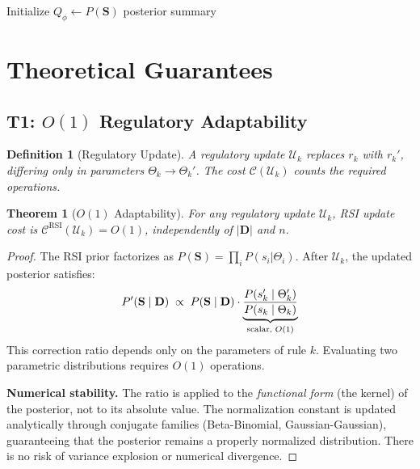 \documentclass[letterpaper]{article}
\newtheorem{theorem}{Theorem}
\newtheorem{definition}{Definition}
\begin{document}
\begin{algorithm}[H]
\SetAlgoLined
{}
Initialize $Q_\phi \leftarrow P(\mathbf{S})$\;
\Return posterior summary
\caption{RSI: Rule-State Inference (Mean-Field VI)}
\label{alg:rsi}
\end{algorithm}

\section{Theoretical Guarantees}
\label{sec:theory}

\subsection{T1: $O(1)$ Regulatory Adaptability}

\begin{definition}[Regulatory Update]
A regulatory update $\mathcal{U}_k$ replaces $r_k$ with $r_k'$,
differing only in parameters $\Theta_k \to \Theta_k'$.
The cost $\mathcal{C}(\mathcal{U}_k)$ counts the required operations.
\end{definition}

\begin{theorem}[$O(1)$ Adaptability]
\label{thm:o1}
For any regulatory update $\mathcal{U}_k$, RSI update cost is
$\mathcal{C}^{\mathrm{RSI}}(\mathcal{U}_k) = O(1)$, independently
of $|\mathbf{D}|$ and $n$.
\end{theorem}

\begin{proof}
The RSI prior factorizes as $P(\mathbf{S}) = \prod_i P(s_i | \Theta_i)$.
After $\mathcal{U}_k$, the updated posterior satisfies:
\[
  P'(\mathbf{S} \mid \mathbf{D}) \;\propto\; P(\mathbf{S} \mid \mathbf{D})
  \cdot \underbrace{\frac{P(s_k' \mid \Theta_k')}{P(s_k \mid \Theta_k)}}_{%
    \text{scalar, } O(1)}
\]
This correction ratio depends only on the parameters of rule $k$.
Evaluating two parametric distributions requires $O(1)$ operations.

\noindent\textbf{Numerical stability.} The ratio is applied to the
\emph{functional form} (the kernel) of the posterior, not to its
absolute value. The normalization constant is updated analytically
through conjugate families (Beta-Binomial, Gaussian-Gaussian),
guaranteeing that the posterior remains a properly normalized
distribution. There is no risk of variance explosion or numerical
divergence.
\end{proof}
\end{document}
